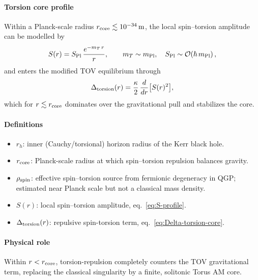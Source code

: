 \documentclass{article}
\newcommand{\Splanck}{\ensuremath{S_{\mathrm{Pl}}}}
\begin{document}
\paragraph{Torsion core profile}
Within a Planck-scale radius \(r_{\rm core}\lesssim10^{-34}\,\mathrm m\), the local spin–torsion
amplitude can be modelled by
\begin{equation}\label{eq:S-profile}
  S(r) = \Splanck\,\frac{e^{-m_T\,r}}{r},
  \qquad
  m_T\sim m_{\rm Pl},
  \quad
  \Splanck\sim\mathcal O(\hbar\,m_{\rm Pl})\,,
\end{equation}
and enters the modified TOV equilibrium through
\begin{equation}\label{eq:Delta-torsion-core}
  \Delta_{\rm torsion}(r)
    = \frac{\kappa}{2}\,\frac{d}{dr}\bigl[S(r)^2\bigr],
\end{equation}
which for \(r\lesssim r_{\rm core}\) dominates over the gravitational pull and stabilizes the core.

\paragraph{Definitions}
\begin{itemize}
  \item \(r_h\): inner (Cauchy/torsional) horizon radius of the Kerr black hole.
  \item \(r_{\rm core}\): Planck-scale radius at which spin–torsion repulsion balances gravity.
\item \(\rho_{\rm spin}\): effective spin–torsion source from fermionic degeneracy in QGP; estimated near Planck scale but not a classical mass density.

  \item \(S(r)\): local spin–torsion amplitude, eq.~\eqref{eq:S-profile}.
  \item \(\Delta_{\rm torsion}(r)\): repulsive spin-torsion term, eq.~\eqref{eq:Delta-torsion-core}.
\end{itemize}

\paragraph{Physical role}
Within \(r<r_{\rm core}\), torsion-repulsion completely counters the TOV gravitational term, replacing
the classical singularity by a finite, solitonic Torus AM core.

\medskip
\begin{center}
\end{center}
\medskip
\end{document}
